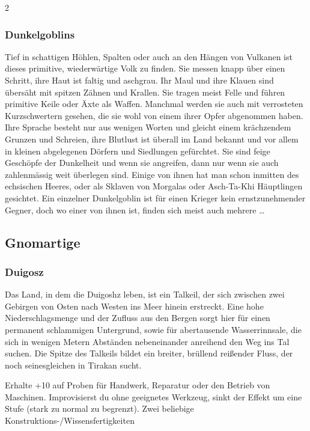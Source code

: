 {\begin{multicols*}{2}
        \subsubsection*{Dunkelgoblins}
        Tief in schattigen Höhlen, Spalten oder auch an den Hängen von Vulkanen ist dieses primitive, wiederwärtige Volk zu finden. Sie messen knapp über einen Schritt, ihre Haut ist faltig und aschgrau. Ihr Maul und ihre Klauen sind übersäht mit spitzen Zähnen und Krallen. Sie tragen meist Felle und führen primitive Keile oder Äxte als Waffen. Manchmal werden sie auch mit verrosteten Kurzschwertern gesehen, die sie wohl von einem ihrer Opfer abgenommen haben. Ihre Sprache besteht nur aus wenigen Worten und gleicht einem krächzendem Grunzen und Schreien, ihre Blutlust ist überall im Land bekannt und vor allem in kleinen abgelegenen Dörfern und Siedlungen gefürchtet. Sie sind feige Geschöpfe der Dunkelheit und wenn sie angreifen, dann nur wenn sie auch zahlenmässig weit überlegen sind. Einige von ihnen hat man schon inmitten des echsischen Heeres, oder als Sklaven von Morgalas oder Asch-Ta-Khi Häuptlingen gesichtet. Ein einzelner Dunkelgoblin ist für einen Krieger kein ernstzunehmender Gegner, doch wo einer von ihnen ist, finden sich meist auch mehrere \ldots

        \subsection{Gnomartige}\label{subsec:abstammungen-gnomartige}

        \subsubsection*{Duigosz}
        Das Land, in dem die Duigoshz leben, ist ein Talkeil, der sich zwischen zwei Gebirgen von Osten nach Westen ins Meer hinein erstreckt. Eine hohe Niederschlagsmenge und der Zufluss aus den Bergen sorgt hier für einen permanent schlammigen Untergrund, sowie für abertausende Wasserrinnsale, die sich in wenigen Metern Abständen nebeneinander anreihend den Weg ins Tal suchen. Die Spitze des Talkeils bildet ein breiter, brüllend reißender Fluss, der noch seinesgleichen in Tirakan sucht.

        \abstammungspielwertebox
        {Erhalte +10 auf Proben für Handwerk, Reparatur oder den Betrieb von Maschinen.}
        {Improvisierst du ohne geeignetes Werkzeug, sinkt der Effekt um eine Stufe (stark zu normal zu begrenzt).}
        {Zwei beliebige Konstruktions-/Wissensfertigkeiten}


\end{multicols*}}

